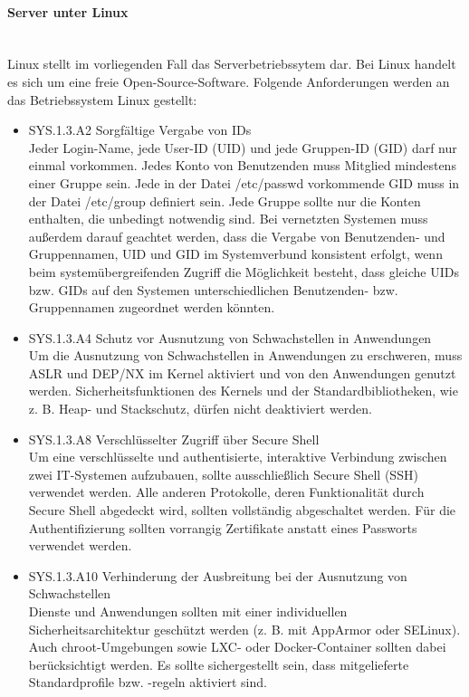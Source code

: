 \paragraph{Server unter Linux}
\noindent \\Linux stellt im vorliegenden Fall das Serverbetriebssytem dar. Bei Linux handelt es sich um eine freie Open-Source-Software. Folgende Anforderungen werden an das Betriebssystem Linux gestellt:

\begin{itemize}
	\item	SYS.1.3.A2 Sorgf\"altige Vergabe von IDs\\ 
	Jeder Login-Name, jede User-ID (UID) und jede Gruppen-ID (GID) darf nur einmal vorkommen. Jedes Konto von Benutzenden muss Mitglied mindestens einer Gruppe sein. Jede in der Datei /etc/passwd vorkommende GID muss in der Datei /etc/group definiert sein. Jede Gruppe sollte nur die Konten enthalten, die unbedingt notwendig sind. Bei vernetzten Systemen muss au{\ss}erdem darauf geachtet werden, dass die Vergabe von Benutzenden- und Gruppennamen, UID und GID im Systemverbund konsistent erfolgt, wenn beim system\"ubergreifenden Zugriff die M\"oglichkeit besteht, dass gleiche UIDs bzw. GIDs auf den Systemen unterschiedlichen Benutzenden- bzw. Gruppennamen zugeordnet werden k\"onnten.\\
	
	\item SYS.1.3.A4 Schutz vor Ausnutzung von Schwachstellen in Anwendungen\\
	Um die Ausnutzung von Schwachstellen in Anwendungen zu erschweren, muss ASLR und DEP/NX im Kernel aktiviert und von den Anwendungen genutzt werden. Sicherheitsfunktionen des Kernels und der Standardbibliotheken, wie z. B. Heap- und Stackschutz, d\"urfen nicht deaktiviert werden.\\
	
	\item SYS.1.3.A8 Verschl\"usselter Zugriff \"uber Secure Shell\\
	Um eine verschl\"usselte und authentisierte, interaktive Verbindung zwischen zwei IT-Systemen aufzubauen, sollte ausschlie{\ss}lich Secure Shell (SSH) verwendet werden. Alle anderen Protokolle, deren Funktionalit\"at durch Secure Shell abgedeckt wird, sollten vollst\"andig abgeschaltet werden. F\"ur die Authentifizierung sollten vorrangig Zertifikate anstatt eines Passworts verwendet werden.\\

	\item SYS.1.3.A10 Verhinderung der Ausbreitung bei der Ausnutzung von Schwachstellen\\
	Dienste und Anwendungen sollten mit einer individuellen Sicherheitsarchitektur gesch\"utzt werden (z. B. mit AppArmor oder SELinux). Auch chroot-Umgebungen sowie LXC- oder Docker-Container sollten dabei ber\"ucksichtigt werden. Es sollte sichergestellt sein, dass mitgelieferte Standardprofile bzw. -regeln aktiviert sind.\\
\end{itemize} 

